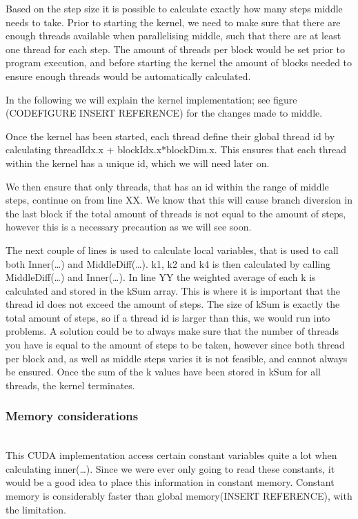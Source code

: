 Based on the step size it is possible to calculate exactly how many steps middle needs to take. Prior to starting the kernel, we need to make sure that there are enough threads available when parallelising middle, such that there are at least one thread for each step. The amount of threads per block would be set prior to program execution, and before starting the kernel the amount of blocks needed to ensure enough threads would be automatically calculated.

In the following we will explain the kernel implementation; see figure (CODEFIGURE INSERT REFERENCE) for the changes made to middle. 

Once the kernel has been started, each thread define their global thread id by calculating threadIdx.x + blockIdx.x*blockDim.x. This ensures that each thread within the kernel has a unique id, which we will need later on.

We then ensure that only threads, that has an id within the range of middle steps, continue on from line XX. We know that this will cause branch diversion in the last block if the total amount of threads is not equal to the amount of steps, however this is a necessary precaution as we will see soon.

The next couple of lines is used to calculate local variables, that is used to call both Inner(…) and MiddleDiff(…). k1, k2 and k4 is then calculated by calling MiddleDiff(…) and Inner(…). In line YY the weighted average of each k is calculated and stored in the kSum array. This is where it is important that the thread id does not exceed the amount of steps. The size of kSum is exactly the total amount of steps, so if a thread id is larger than this, we would run into problems. A solution could be to always make sure that the number of threads you have is equal to the amount of steps to be taken, however since both thread per block and, as well as middle steps varies it is not feasible, and cannot always be ensured. Once the sum of the k values have been stored in kSum for all threads, the kernel terminates.

\subsubsection{Memory considerations} \hfill \\
This CUDA implementation access certain constant variables quite a lot when calculating inner(…). Since we were ever only going to read these constants, it would be a good idea to place this information in constant memory. Constant memory is considerably faster than global memory(INSERT REFERENCE), with the limitation.

